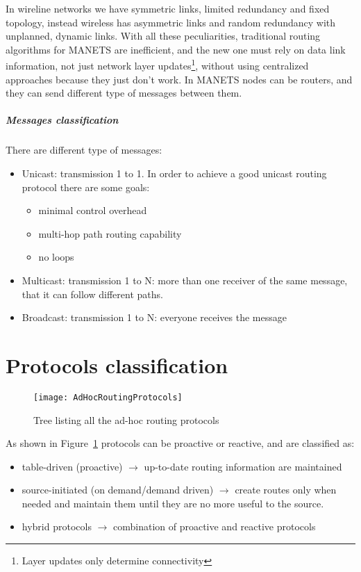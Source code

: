In wireline networks we have symmetric links, limited redundancy and fixed
topology, instead wireless has asymmetric links and random redundancy with
unplanned, dynamic links. With all these peculiarities, traditional routing
algorithms for MANETS are inefficient, and the new one must rely on data link
information, not just network layer updates\footnote{Layer updates only
  determine connectivity}, without using centralized approaches because they
just don't work. In MANETS nodes can be routers, and they can send different
type of messages between them.
\subparagraph*{Messages classification} There are different type of messages:
\begin{itemize}
\item Unicast: transmission 1 to 1. In order to achieve a good unicast routing
  protocol there are some goals:
  \begin{itemize}
  \item minimal control overhead
  \item multi-hop path routing capability
  \item no loops
  \end{itemize}
\item Multicast: transmission 1 to N: more than one receiver of the same
message, that it can follow different paths.
\item Broadcast: transmission 1 to N: everyone receives the message
\end{itemize}

\section{Protocols classification}

\begin{figure}[H]
  \centering
  \texttt{[image: AdHocRoutingProtocols]}
  \caption{Tree listing all the ad-hoc routing protocols}
  \label{fig:mac:adHocRoutingProtocols}
\end{figure}

As shown in Figure~\ref{fig:mac:adHocRoutingProtocols} protocols can be
proactive or reactive, and are classified as:
\begin{itemize}
\item table-driven (proactive) $\to$ up-to-date routing information are
  maintained
\item source-initiated (on demand/demand driven) $\to$ create routes only when
needed and maintain them until they are no more useful to the source.
\item hybrid protocols $\to$ combination of proactive and reactive protocols
\end{itemize}

